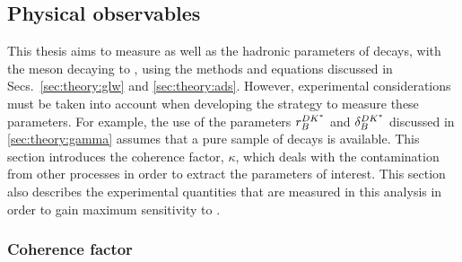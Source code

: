 \subsection{Physical observables}

This thesis aims to measure \Pgamma as well as the hadronic parameters of \btodkst decays, with the \Kstarm meson decaying to \KS\pim, using the methods and equations discussed in Secs.~\ref{sec:theory:glw} and \ref{sec:theory:ads}. However, experimental considerations must be taken into account when developing the strategy to measure these parameters. For example, the use of the parameters $r_B^{DK^*}$ and $\delta_B^{DK^*}$ discussed in \sect\ref{sec:theory:gamma} assumes that a pure sample of \btodkst decays is available. This section introduces the \btodkst coherence factor, $\kappa$, which deals with the contamination from other \decay{\Bm}{\D\KS\pim} processes in order to extract the parameters of interest. This section also describes the experimental quantities that are measured in this analysis in order to gain maximum sensitivity to \Pgamma. 

\subsubsection{Coherence factor}
\label{sec:theory:kappa}

